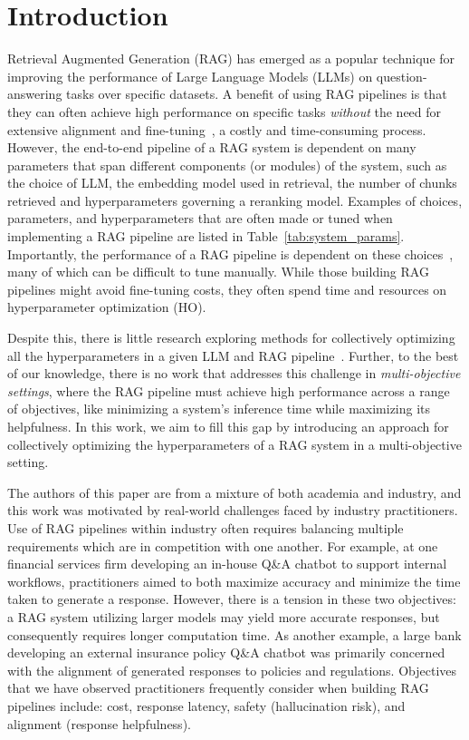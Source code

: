 \section{Introduction}
Retrieval Augmented Generation (RAG) has emerged as a popular technique for improving the performance of Large Language Models (LLMs) on question-answering tasks over specific datasets. A benefit of using RAG pipelines is that they can often achieve high performance on specific tasks \emph{without} the need for extensive alignment and fine-tuning~\citep{gupta2024rag}, a costly and time-consuming process. However, the end-to-end pipeline of a RAG system is dependent on many parameters that span different components (or modules) of the system, such as the choice of LLM, the embedding model used in retrieval, the number of chunks retrieved and hyperparameters governing a reranking model. Examples of choices, parameters, and hyperparameters that are often made or tuned when implementing a RAG pipeline are listed in Table~\ref{tab:system_params}. Importantly, the performance of a RAG pipeline is dependent on these choices~\citep{fu2024autorag}, many of which can be difficult to tune manually. While those building RAG pipelines might avoid fine-tuning costs, they often spend time and resources on hyperparameter optimization (HO).%

Despite this, there is little research exploring methods for collectively optimizing all the hyperparameters in a given LLM and RAG pipeline~\citep{fu2024autorag}. Further, to the best of our knowledge, there is no work that addresses this challenge in \emph{multi-objective settings}, where the RAG pipeline must achieve high performance across a range of objectives,
like 
minimizing a system's inference time while maximizing its helpfulness. In this work, we aim to fill this gap by introducing an approach for collectively optimizing the hyperparameters of a RAG system in a multi-objective setting.

The authors of this paper are from a mixture of both academia and industry, and this work was motivated by real-world challenges faced by industry practitioners. Use of RAG pipelines within industry often requires balancing multiple requirements which are in competition with one another. For example, at one financial services firm developing an in-house Q\&A chatbot to support internal workflows, practitioners aimed to both maximize accuracy and minimize the time taken to generate a response. However, there is a tension in these two objectives: a RAG system utilizing larger models may yield more accurate responses, but consequently requires longer computation time. As another example, a large bank developing an external insurance policy Q\&A chatbot was primarily concerned with the alignment of generated responses to policies and regulations. Objectives that we have observed practitioners frequently consider when building RAG pipelines include: cost, response latency, safety (hallucination risk), and alignment (response helpfulness).

